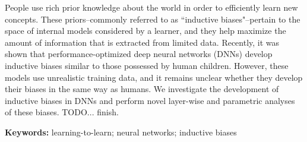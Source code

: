 People use rich prior knowledge about the world in order
to efficiently learn new concepts. These priors--commonly referred to as
``inductive biases"--pertain to the space of internal models considered by a
learner, and they help maximize the amount of information that is extracted
from limited data. Recently, it was shown that performance-optimized
deep neural networks (DNNs) develop inductive biases similar to those
possessed by human children. However, these models use unrealistic training
data, and it remains unclear whether they develop their biases in the same way
as humans. We investigate the development of inductive biases in DNNs and
perform novel layer-wise and parametric analyses of these biases. TODO... finish.

\textbf{Keywords:}
learning-to-learn; neural networks; inductive biases